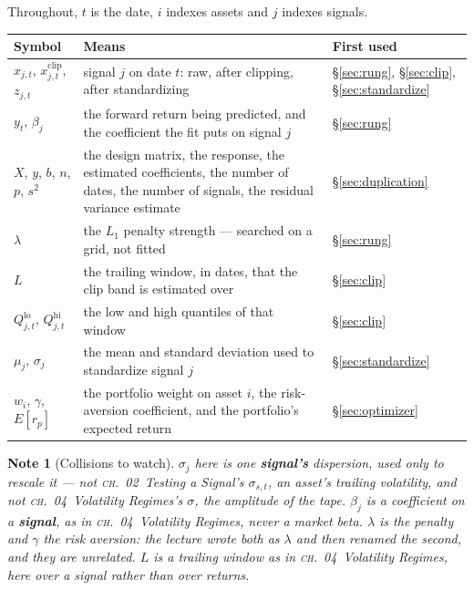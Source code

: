 \documentclass[11pt]{article}
\theoremstyle{runin}
\newtheorem*{note}{Note}
\newcommand{\ch}[2]{\textsc{ch.~#1}~\textit{#2}}
\begin{document}
Throughout, $t$ is the date, $i$ indexes assets and $j$ indexes signals.

\begin{center}
\begin{tabularx}{\linewidth}{@{}L{4cm}XL{2.6cm}@{}}
\toprule
\textbf{Symbol} & \textbf{Means} & \textbf{First used} \\
\midrule
$x_{j,t}$, $x^{\mathrm{clip}}_{j,t}$, $z_{j,t}$
& signal $j$ on date $t$: raw, after clipping, after standardizing
& \S\ref{sec:rung}, \S\ref{sec:clip}, \S\ref{sec:standardize} \\
\addlinespace
$y_t$, $\beta_j$
& the forward return being predicted, and the coefficient the fit puts on signal $j$
& \S\ref{sec:rung} \\
\addlinespace
$X$, $y$, $b$, $n$, $p$, $s^2$
& the design matrix, the response, the estimated coefficients, the number of dates, the number of
signals, the residual variance estimate
& \S\ref{sec:duplication} \\
\addlinespace
$\lambda$
& the $L_1$ penalty strength --- searched on a grid, not fitted
& \S\ref{sec:rung} \\
\addlinespace
$L$
& the trailing window, in dates, that the clip band is estimated over
& \S\ref{sec:clip} \\
\addlinespace
$Q^{\mathrm{lo}}_{j,t}$, $Q^{\mathrm{hi}}_{j,t}$
& the low and high quantiles of that window
& \S\ref{sec:clip} \\
\addlinespace
$\mu_j$, $\sigma_j$
& the mean and standard deviation used to standardize signal $j$
& \S\ref{sec:standardize} \\
\addlinespace
$w_i$, $\gamma$, $E[r_p]$
& the portfolio weight on asset $i$, the risk-aversion coefficient, and the portfolio's expected
return
& \S\ref{sec:optimizer} \\
\bottomrule
\end{tabularx}
\end{center}

\begin{note}[Collisions to watch]
$\sigma_j$ here is one \textbf{signal's} dispersion, used only to rescale it --- not
\ch{02}{Testing a Signal}'s $\sigma_{s,t}$, an asset's trailing volatility, and not
\ch{04}{Volatility Regimes}'s $\sigma$, the amplitude of the tape. $\beta_j$ is a coefficient on a
\textbf{signal}, as in \ch{04}{Volatility Regimes}, never a market beta. $\lambda$ is the penalty
and $\gamma$ the risk aversion: the lecture wrote both as $\lambda$ and then renamed the second,
and they are unrelated. $L$ is a trailing window as in \ch{04}{Volatility Regimes}, here over a
signal rather than over returns.
\end{note}
\end{document}
